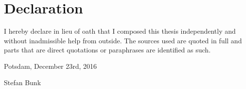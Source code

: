 \documentclass[
        a4paper,
        titlepage,
        twoside,
        parskip,
        numbers=noenddot
        ]{scrbook}
\theoremstyle{break}
\begin{document}
\cleardoublepage
\section*{Declaration}
\label{sec:declaration}


I hereby declare in lieu of oath that I composed this thesis independently and without inadmissible help from outside. The sources used are quoted in full and parts that are direct quotations or paraphrases are identified as such.

\vspace{14mm}

Potsdam, December 23rd, 2016

\vspace{20 mm}

Stefan Bunk






\end{document}
